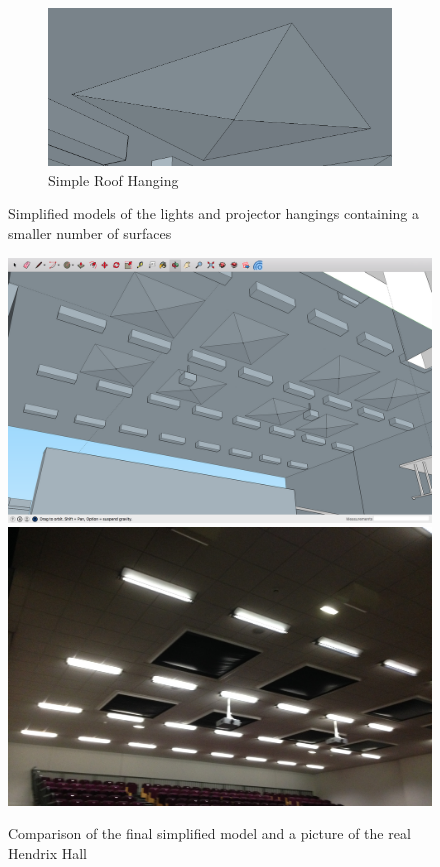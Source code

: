 \documentclass[../../main.tex]{subfiles}
\begin{document}
\begin{figure}[ht]
\begin{subfigure}[t]{3in}
					\centering
					\includegraphics[scale = 0.25]{Sections/Implementation/Modelling/images/concaveSimple.png}
					\caption{Simple Roof Hanging}
				\end{subfigure}
				\caption{Simplified models of the lights and projector hangings containing a smaller number of surfaces}
				\label{simpleSurfaces}
			\end{figure}

		\begin{figure}[ht]
				\center\includegraphics[scale = 0.3]{Sections/Implementation/Modelling/images/realVsSku/roofSku.png}
				\center\includegraphics[scale = 0.13]{Sections/Implementation/Modelling/images/HHroof.jpg}
				\caption{Comparison of the final simplified model and a picture of the real Hendrix Hall}
				\label{simpleSurfacesRoom}
			\end{figure}
\end{document}
